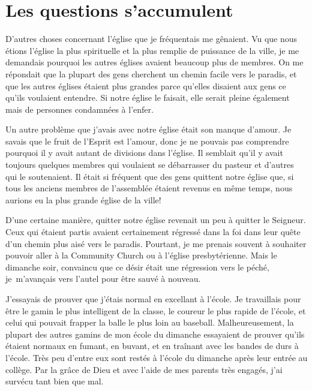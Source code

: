 \section{Les questions s'accumulent}

D'autres choses concernant l'église que je fréquentais me gênaient.
 Vu que nous étions l'église la plus spirituelle et la plus remplie
 de puissance de la ville,
 je me demandais pourquoi les autres églises avaient beaucoup plus
 de membres. On me répondait que la plupart des
 gens cherchent un chemin facile vers le paradis, et que les autres églises
 étaient plus grandes parce qu'elles disaient aux gens ce qu'ils voulaient
 entendre. Si notre église le faisait, elle serait pleine également
 mais de personnes condamnées à l'enfer.

Un autre problème que j'avais avec notre église était son manque d'amour. Je
 savais que le fruit de l'Esprit est l'amour,
 donc je ne pouvais pas comprendre
 pourquoi il y avait autant de divisions dans l'église. Il semblait
 qu'il y avait toujours quelques membres qui voulaient se débarrasser du pasteur et
 d'autres qui le soutenaient. Il était si fréquent que des gens quittent notre église que,
 si tous les anciens membres de l'assemblée étaient revenus en même temps, nous aurions
 eu la plus grande église de la ville!

D'une certaine manière, quitter notre église revenait un peu à quitter le
 Seigneur. Ceux qui étaient partis avaient certainement régressé dans la foi dans leur quête
 d'un chemin plus aisé vers le paradis. Pourtant, je me prenais souvent à
 souhaiter pouvoir aller à la \Og Community Church \Fg{} ou à l'église presbytérienne. Mais
 le dimanche soir, convaincu que ce désir était une régression vers le péché, je~m'avançais vers l'autel pour être \Og sauvé \Fg{} à nouveau.
 
J'essayais de prouver que j'étais normal en excellant à l'école. Je travaillais
 pour être le gamin le plus intelligent de la classe, le coureur le plus rapide de
 l'école, et celui qui pouvait frapper la balle le plus loin au baseball.
 Malheureusement, la plupart des autres gamins de mon école du dimanche
 essayaient de prouver qu'ils étaient normaux en fumant, en buvant, et en
 traînant avec les bandes de durs à l'école. Très peu d'entre eux sont restés à
 l'école du dimanche après leur entrée au collège. Par la grâce de Dieu et avec
 l'aide de mes parents très engagés, j'ai survécu tant bien que mal.

